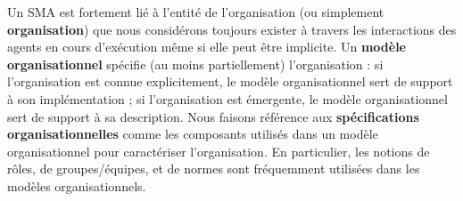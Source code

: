 

Un SMA est fortement lié à l'entité de l'organisation (ou simplement \textbf{organisation}) que nous considérons toujours exister à travers les interactions des agents en cours d'exécution même si elle peut être implicite.
%
%
Un \textbf{modèle organisationnel} spécifie (au moins partiellement) l'organisation : si l'organisation est connue explicitement, le modèle organisationnel sert de support à son implémentation ; si l'organisation est émergente, le modèle organisationnel sert de support à sa description. Nous faisons référence aux \textbf{spécifications organisationnelles} comme les composants utilisés dans un modèle organisationnel pour caractériser l'organisation.
En particulier, les notions de rôles, de groupes/équipes, et de normes sont fréquemment utilisées dans les modèles organisationnels.

